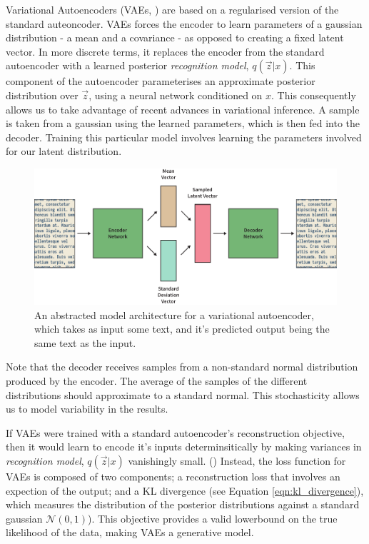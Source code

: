 \documentclass[12pt,twoside]{report}
\begin{document}
Variational Autoencoders (VAEs, \cite{kingma_auto-encoding_2013}) are based on a regularised version of the standard auteoncoder. VAEs forces the encoder to learn parameters of a gaussian distribution - a mean and a covariance - as opposed to creating a fixed latent vector. In more discrete terms, it replaces the encoder from the standard autoencoder with a learned posterior \textit{recognition model}, $q(\overrightarrow{z}|x)$. This component of the autoencoder parameterises an approximate posterior distribution over $\overrightarrow{z}$, using a neural network conditioned on $x$. This consequently allows us to take advantage of recent advances in variational inference.  A sample is taken from a gaussian using the learned parameters, which is then fed into the decoder. Training this particular model involves learning the parameters involved for our latent distribution.

\begin{figure}[!ht]
	\centering
	\includegraphics[width=150mm]{diagrams/variational_autoencoders.pdf}
	\caption{An abstracted model architecture for a variational autoencoder, which takes as input some text, and it's predicted output being the same text as the input.\label{vae}}
  \end{figure}

Note that the decoder receives samples from a non-standard normal distribution produced by the encoder. The average of the samples of the different distributions should approximate to a standard normal. This stochasticity allows us to model variability in the results. 

If VAEs were trained with a standard autoencoder's reconstruction objective, then it would learn to encode it's inputs determinsitically by making variances in \textit{recognition model}, $q(\overrightarrow{z}|x)$ vanishingly small. (\cite{raiko_techniques_2014}) Instead, the loss function for VAEs is composed of two components; a reconstruction loss that involves an expection of the output; and a KL divergence (see Equation \ref{eqn:kl_divergence}), which measures the distribution of the posterior distributions against a standard gaussian $ \mathcal{N}(0,1)$). This objective provides a valid lowerbound on the true likelihood of the data, making VAEs a generative model.
  
\end{document}
